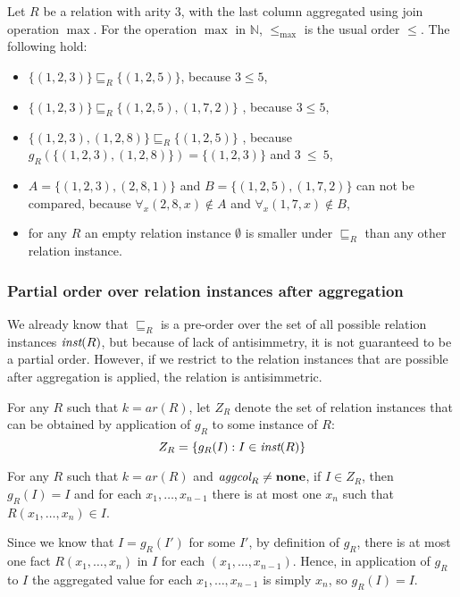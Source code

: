 \begin{exmp}
Let $R$ be a relation with arity $3$, with the last column aggregated using join operation $\max$.
For the operation $ \max $ in $\mathbb{N}$, $ \le_{\max} $ is the usual order $ \le $. The following hold:
\begin{itemize}
\item $\{(1, 2, 3)\} \sqsubseteq_R \{(1, 2, 5)\}$, because $3 \le 5$,
\item $\{(1, 2, 3)\} \sqsubseteq_R \{(1, 2, 5), (1, 7, 2)\}$ , because $3 \le 5$,
\item $\{(1, 2, 3), (1, 2, 8)\} \sqsubseteq_R \{(1, 2, 5)\}$ , because $g_R(\{(1, 2, 3), (1, 2, 8)\}) = \{(1,2,3)\}$ and $3~\le~5$,
\item $A = \{(1, 2, 3), (2, 8, 1)\}$ and  $B = \{(1, 2, 5), (1, 7, 2)\}$ can not be compared, because $\forall_x (2, 8, x) \notin A$ and $\forall_x (1, 7, x) \notin B$,
\item for any $R$ an empty relation instance $\emptyset$ is smaller under $\sqsubseteq_R$  than any other relation instance.
\end{itemize}
\label{ex:sqsubseteqorder}
\end{exmp}


\subsubsection{Partial order over relation instances after aggregation}

We already know that $\sqsubseteq_R$ is a pre-order over the set of all possible relation instances $\textit{inst}(R)$, but because of lack of antisimmetry, it is not guaranteed to be a partial order. However, if we restrict to the relation instances that are possible after aggregation is applied, the relation is antisimmetric.

For any $R$ such that $k=ar(R)$, let $Z_R$ denote the set of relation instances that can be obtained by application of $g_R$ to some instance of $R$:
$$Z_R = \{g_R(I): I \in \textit{inst}(R)\}$$


\begin{lem}\label{lem:fixgr}
For any $R$ such that $k=ar(R)$ and $\textit{aggcol}_R \ne {\bf none}$, if $I \in Z_R$, then $g_R(I) = I$ and for each $x_1, \dots, x_{n-1}$ there is at most one $x_n$ such that $R(x_1, \dots, x_n) \in I$.
\end{lem}
\begin{prof}
Since we know that $I = g_R(I')$ for some $I'$, by definition of $g_R$, there is at most one fact $R(x_1, \dots, x_n)$ in $I$ for each $(x_1, \dots, x_{n-1})$. Hence, in application of $g_R$ to $I$ the aggregated value for each $x_1, \dots, x_{n-1}$ is simply $x_n$, so $g_R(I) = I$.
\end{prof}

